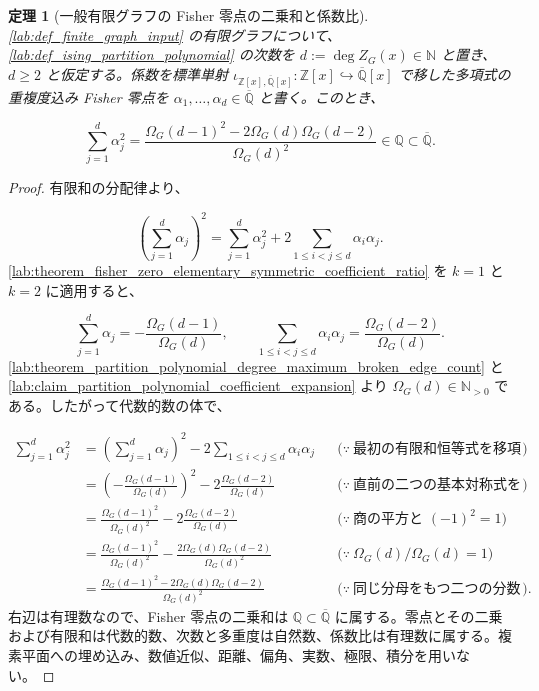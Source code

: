 \documentclass[11pt,a4paper]{article}
\newtheorem{theorem}[definition]{定理}
\theoremstyle{remark}
\begin{document}
\begin{theorem}[一般有限グラフの Fisher 零点の二乗和と係数比]\label{lab:theorem_fisher_zero_square_sum_coefficient_ratio}
\cref{lab:def_finite_graph_input}
 の有限グラフについて、
\cref{lab:def_ising_partition_polynomial}
 の次数を
$d:=\deg Z_G(x)\in\mathbb N$
 と置き、
$d\ge2$
 と仮定する。係数を標準単射
$\iota_{\mathbb Z[x],\overline{\mathbb Q}[x]}:\mathbb Z[x]\hookrightarrow\overline{\mathbb Q}[x]$
 で移した多項式の重複度込み Fisher 零点を
$\alpha_1,\ldots,\alpha_d\in\overline{\mathbb Q}$
 と書く。このとき、

\[\sum_{j=1}^{d}\alpha_j^2
=
\frac{
  \Omega_G(d-1)^2-2\Omega_G(d)\Omega_G(d-2)
}{
  \Omega_G(d)^2
}
\in\mathbb Q
\subset\overline{\mathbb Q}.\]
\end{theorem}
\begin{proof}
有限和の分配律より、

\[\left(\sum_{j=1}^{d}\alpha_j\right)^2
=
\sum_{j=1}^{d}\alpha_j^2
+
2\sum_{1\le i<j\le d}\alpha_i\alpha_j.\]
\cref{lab:theorem_fisher_zero_elementary_symmetric_coefficient_ratio}
 を
$k=1$
 と
$k=2$
 に適用すると、

\[\sum_{j=1}^{d}\alpha_j
=
-\frac{\Omega_G(d-1)}{\Omega_G(d)},
\qquad
\sum_{1\le i<j\le d}\alpha_i\alpha_j
=
\frac{\Omega_G(d-2)}{\Omega_G(d)}.\]
\cref{lab:theorem_partition_polynomial_degree_maximum_broken_edge_count}
 と
\cref{lab:claim_partition_polynomial_coefficient_expansion}
 より
$\Omega_G(d)\in\mathbb N_{>0}$
 である。したがって代数的数の体で、

\[\begin{aligned}
\sum_{j=1}^{d}\alpha_j^2
&=
\left(\sum_{j=1}^{d}\alpha_j\right)^2
-
2\sum_{1\le i<j\le d}\alpha_i\alpha_j
&&\bigl(\because\ \text{最初の有限和恒等式を移項する}\bigr)\\
&=
\left(-\frac{\Omega_G(d-1)}{\Omega_G(d)}\right)^2
-
2\frac{\Omega_G(d-2)}{\Omega_G(d)}
&&\bigl(\because\ \text{直前の二つの基本対称式を代入する}\bigr)\\
&=
\frac{\Omega_G(d-1)^2}{\Omega_G(d)^2}
-
2\frac{\Omega_G(d-2)}{\Omega_G(d)}
&&\bigl(\because\ \text{商の平方と }(-1)^2=1\bigr)\\
&=
\frac{\Omega_G(d-1)^2}{\Omega_G(d)^2}
-
\frac{2\Omega_G(d)\Omega_G(d-2)}{\Omega_G(d)^2}
&&\bigl(\because\ \Omega_G(d)/\Omega_G(d)=1\bigr)\\
&=
\frac{
  \Omega_G(d-1)^2-2\Omega_G(d)\Omega_G(d-2)
}{
  \Omega_G(d)^2
}
&&\bigl(\because\ \text{同じ分母をもつ二つの分数を引く}\bigr).
\end{aligned}\]
右辺は有理数なので、Fisher 零点の二乗和は
$\mathbb Q\subset\overline{\mathbb Q}$
 に属する。零点とその二乗および有限和は代数的数、次数と多重度は自然数、係数比は有理数に属する。複素平面への埋め込み、数値近似、距離、偏角、実数、極限、積分を用いない。

\end{proof}
\end{document}

